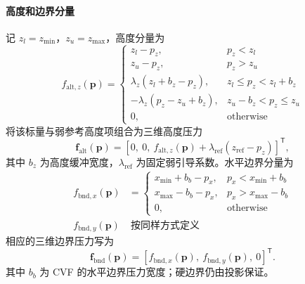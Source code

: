 \paragraph{高度和边界分量}
记 $z_l=z_{\min}$，$z_u=z_{\max}$，高度分量为
\begin{equation}
f_{\mathrm{alt},z}(\mathbf p)=
\begin{cases}
z_l-p_z, & p_z<z_l\\
z_u-p_z, & p_z>z_u\\
\lambda_z(z_l+b_z-p_z), & z_l\leq p_z<z_l+b_z\\
-\lambda_z(p_z-z_u+b_z), & z_u-b_z<p_z\leq z_u\\
0, & \mathrm{otherwise}
\end{cases}
\label{eq:altitude-pressure}
\end{equation}
将该标量与弱参考高度项组合为三维高度压力
\begin{equation}
    \mathbf f_{\mathrm{alt}}(\mathbf p)=
    \left[0,\ 0,\ f_{\mathrm{alt},z}(\mathbf p)+\lambda_{\mathrm{ref}}(z_{\mathrm{ref}}-p_z)\right]^\mathsf T,
    \label{eq:altitude-pressure-vector}
\end{equation}
其中 $b_z$ 为高度缓冲宽度，$\lambda_{\mathrm{ref}}$ 为固定弱引导系数。水平边界分量为
\begin{equation}
\begin{aligned}
f_{\mathrm{bnd},x}(\mathbf p)&=
\begin{cases}
x_{\min}+b_b-p_x, & p_x<x_{\min}+b_b\\
x_{\max}-b_b-p_x, & p_x>x_{\max}-b_b\\
0, & \mathrm{otherwise}
\end{cases}\\
f_{\mathrm{bnd},y}(\mathbf p)&\ \text{按同样方式定义}
\end{aligned}
\label{eq:boundary-pressure}
\end{equation}
相应的三维边界压力写为
\begin{equation}
    \mathbf f_{\mathrm{bnd}}(\mathbf p)=
    \left[f_{\mathrm{bnd},x}(\mathbf p),\ f_{\mathrm{bnd},y}(\mathbf p),\ 0\right]^\mathsf T.
    \label{eq:boundary-pressure-vector}
\end{equation}
其中 $b_b$ 为 CVF 的水平边界压力宽度；硬边界仍由投影保证。

